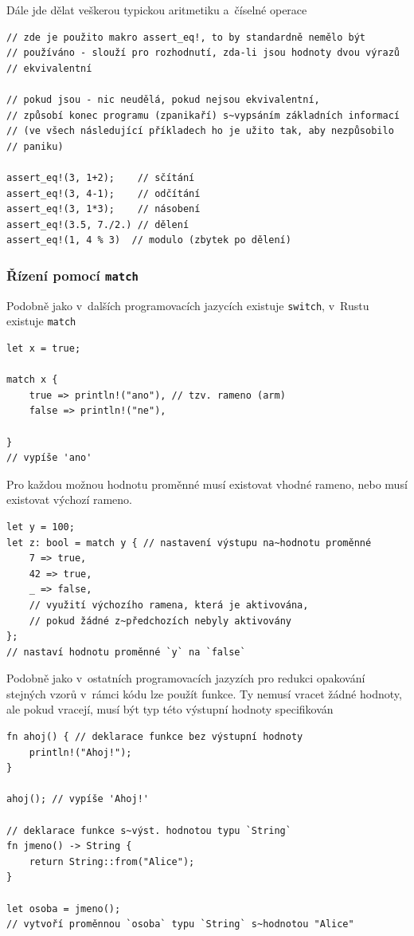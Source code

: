 \documentclass[a4paper, 12pt]{article} %
\newcommand{\rust}[1]{\texttt{#1}}
\begin{document}
        Dále jde dělat veškerou typickou aritmetiku a~číselné operace
        \begin{verbatim}
// zde je použito makro assert_eq!, to by standardně nemělo být
// používáno - slouží pro rozhodnutí, zda-li jsou hodnoty dvou výrazů
// ekvivalentní

// pokud jsou - nic neudělá, pokud nejsou ekvivalentní,
// způsobí konec programu (zpanikaří) s~vypsáním základních informací
// (ve všech následující příkladech ho je užito tak, aby nezpůsobilo 
// paniku)

assert_eq!(3, 1+2);    // sčítání
assert_eq!(3, 4-1);    // odčítání
assert_eq!(3, 1*3);    // násobení
assert_eq!(3.5, 7./2.) // dělení
assert_eq!(1, 4 % 3)  // modulo (zbytek po dělení)
        \end{verbatim}

        \subsubsection*{Řízení pomocí \rust{match}}
            Podobně jako v~dalších programovacích jazycích existuje \texttt{switch}, v~Rustu existuje \rust{match}
            \begin{verbatim}
let x = true;

match x {
    true => println!("ano"), // tzv. rameno (arm)
    false => println!("ne"),
            
}
// vypíše 'ano'
            \end{verbatim}
            
            Pro každou možnou hodnotu proměnné musí existovat vhodné rameno, nebo musí existovat výchozí rameno.
            \begin{verbatim}
let y = 100;
let z: bool = match y { // nastavení výstupu na~hodnotu proměnné
    7 => true,
    42 => true,
    _ => false,
    // využití výchozího ramena, která je aktivována, 
    // pokud žádné z~předchozích nebyly aktivovány
};
// nastaví hodnotu proměnné `y` na `false`
        \end{verbatim}
        
        Podobně jako v~ostatních programovacích jazyzích pro redukci opakování stejných vzorů v~rámci kódu lze použít funkce. Ty nemusí vracet žádné hodnoty, ale pokud vracejí, musí být typ této výstupní hodnoty specifikován
        \begin{verbatim}
fn ahoj() { // deklarace funkce bez výstupní hodnoty
    println!("Ahoj!");
}

ahoj(); // vypíše 'Ahoj!'

// deklarace funkce s~výst. hodnotou typu `String`
fn jmeno() -> String {
    return String::from("Alice");
}

let osoba = jmeno();
// vytvoří proměnnou `osoba` typu `String` s~hodnotou "Alice"
        \end{verbatim}
        
\end{document}
